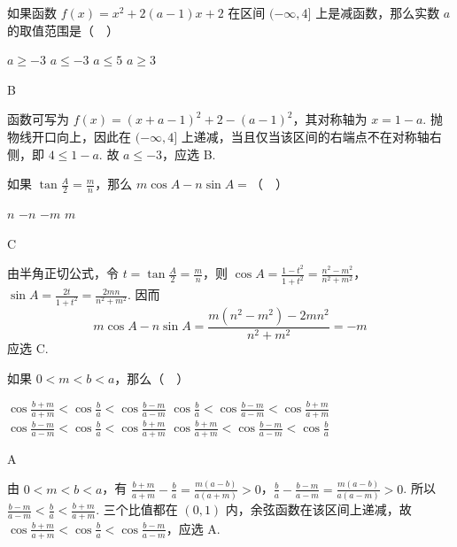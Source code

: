 \begin{problem}
如果函数 \(f(x)=x^2+2(a-1)x+2\) 在区间 \((-\infty,4]\) 上是减函数，那么实数 \(a\) 的取值范围是（\(\quad\)）

\choices
    {\(a\geqslant -3\)}
    {\(a\leqslant -3\)}
    {\(a\leqslant 5\)}
    {\(a\geqslant 3\)}
\end{problem}

\begin{answer}
B
\end{answer}

\begin{solution}
函数可写为 \(f(x)=\left(x+a-1\right)^2+2-(a-1)^2\)，其对称轴为 \(x=1-a\). 抛物线开口向上，因此在 \((-\infty,4]\) 上递减，当且仅当该区间的右端点不在对称轴右侧，即 \(4\leqslant1-a\). 故 \(a\leqslant-3\)，应选 B.
\end{solution}

\begin{problem}
如果 \(\tan \frac{A}{2}=\frac{m}{n}\)，那么 \(m\cos A-n\sin A=\)（\(\quad\)）

\choices
    {\(n\)}
    {\(-n\)}
    {\(-m\)}
    {\(m\)}
\end{problem}

\begin{answer}
C
\end{answer}

\begin{solution}
由半角正切公式，令 \(t=\tan\frac A2=\frac mn\)，则
\(\cos A=\frac{1-t^2}{1+t^2}=\frac{n^2-m^2}{n^2+m^2}\)，\(\sin A=\frac{2t}{1+t^2}=\frac{2mn}{n^2+m^2}\). 因而
\[
m\cos A-n\sin A
=\frac{m(n^2-m^2)-2mn^2}{n^2+m^2}
=-m
\]
应选 C.
\end{solution}

\begin{problem}
如果 \(0<m<b<a\)，那么（\(\quad\)）

\choices
    {\(\cos \frac{b+m}{a+m}<\cos \frac{b}{a}<\cos \frac{b-m}{a-m}\)}
    {\(\cos \frac{b}{a}<\cos \frac{b-m}{a-m}<\cos \frac{b+m}{a+m}\)}
    {\(\cos \frac{b-m}{a-m}<\cos \frac{b}{a}<\cos \frac{b+m}{a+m}\)}
    {\(\cos \frac{b+m}{a+m}<\cos \frac{b-m}{a-m}<\cos \frac{b}{a}\)}
\end{problem}

\begin{answer}
A
\end{answer}

\begin{solution}
由 \(0<m<b<a\)，有
\(\frac{b+m}{a+m}-\frac ba=\frac{m(a-b)}{a(a+m)}>0\)，\(\frac ba-\frac{b-m}{a-m}=\frac{m(a-b)}{a(a-m)}>0\).
所以 \(\frac{b-m}{a-m}<\frac ba<\frac{b+m}{a+m}\). 三个比值都在 \((0,1)\) 内，余弦函数在该区间上递减，故
\(\cos\frac{b+m}{a+m}<\cos\frac ba<\cos\frac{b-m}{a-m}\)，应选 A.
\end{solution}

